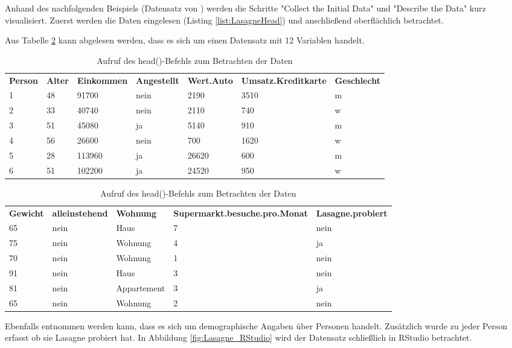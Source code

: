 Anhand des nachfolgenden Beispiels (Datensatz von \citep[Case Lasagne Test.xlsx]{hertle_datenanalyse_2016}) werden die Schritte "Collect the Initial Data" und "Describe the Data" kurz visualisiert. Zuerst werden die Daten eingelesen (Listing \ref{list:LasagneHead}) und anschließend oberflächlich betrachtet.

Aus Tabelle \ref{tab:LasagneHead:output} kann abgelesen werden, dass es sich um einen Datensatz mit 12 Variablen handelt. 
\begin{table}[H] \centering
\centering
\begin{tabular}{|p{1.2cm}|p{0.9cm}|p{2.1cm}|p{1.8cm}|p{1.9cm}|p{3.6cm}|p{1.9cm}|}
  \hline
\textbf{Person} & \textbf{Alter} & \textbf{Einkommen} & \textbf{Angestellt} & \textbf{Wert.Auto} & \textbf{Umsatz.Kreditkarte} & \textbf{Geschlecht} \\ 
  \hhline{=======}
1 &  48 &  91700 & nein & 2190 & 3510 & m\\ 
2 &  33 &  40740 & nein & 2110 & 740& w\\ 
3 &  51 &  45080 & ja & 5140 & 910 & m\\ 
4 &  56 &  26600 & nein & 700 & 1620 & w\\ 
5 &  28 &  113960 & ja & 26620 & 600 & m\\ 
6 &  51 &  102200 & ja & 24520 & 950 & w\\ 
\hline
\end{tabular}
\begin{tabular}{|p{1.4cm}|p{2.3cm}|p{2.2cm}|p{5.8cm}|p{3cm}|}
  \hline
\textbf{Gewicht} & \textbf{alleinstehend} & \textbf{Wohnung} & \textbf{Supermarkt.besuche.pro.Monat} & \textbf{Lasagne.probiert}\\ 
  \hhline{=====}
65 & nein & Haus &   7 & nein\\ 
75 & nein & Wohnung &   4 & ja\\ 
70 & nein & Wohnung &   1 & nein\\ 
91 & nein & Haus &   3 & nein\\ 
81 & nein & Appartement &   3 & ja\\ 
65 & nein & Wohnung &   2 & nein\\ 
   \hline
\end{tabular}
\caption{Aufruf des head()-Befehls zum Betrachten der Daten}
\label{tab:LasagneHead:output}
\end{table}
Ebenfalls entnommen werden kann, dass es sich um demographische Angaben über Personen handelt. Zusätzlich wurde zu jeder Person erfasst ob sie Lasagne probiert hat. In Abbildung \ref{fig:Lasagne_RStudio} wird der Datensatz schließlich in RStudio betrachtet.
